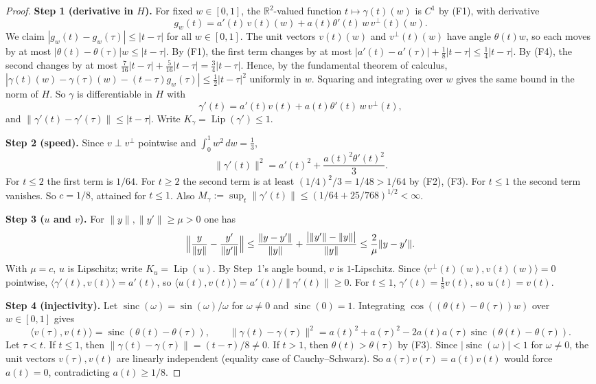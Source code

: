 \documentclass[11pt]{article}
\newcommand{\R}{\mathbb R}
\newcommand{\norm}[1]{\lVert #1\rVert}
\newcommand{\ip}[2]{\langle #1,#2\rangle}
\DeclareMathOperator{\Lip}{Lip}
\DeclareMathOperator{\sinc}{sinc}
\theoremstyle{definition}
\numberwithin{equation}{section}
\newcommand{\step}[1]{\par\smallskip\noindent\textbf{Step #1.}\enspace}
\begin{document}
\begin{proof}
\step{1 (derivative in \(H\))}
For fixed \(w\in[0,1]\), the \(\R^2\)-valued function
\(t\mapsto\gamma(t)(w)\) is \(C^1\) by (F1), with derivative
\[
 g_w(t)=a'(t)\,v(t)(w)+a(t)\theta'(t)\,w\,v^\perp(t)(w).
\]
We claim \(|g_w(t)-g_w(\tau)|\le|t-\tau|\) for all \(w\in[0,1]\).
The unit vectors \(v(t)(w)\) and \(v^\perp(t)(w)\) have angle
\(\theta(t)w\), so each moves by at most
\(|\theta(t)-\theta(\tau)|w\le|t-\tau|\). By (F1), the first term changes
by at most \(|a'(t)-a'(\tau)|+\tfrac18|t-\tau|\le\tfrac14|t-\tau|\). By
(F4), the second changes by at most
\(\tfrac7{16}|t-\tau|+\tfrac5{16}|t-\tau|=\tfrac34|t-\tau|\).
Hence, by the fundamental theorem of calculus,
\(|\gamma(t)(w)-\gamma(\tau)(w)-(t-\tau)g_w(\tau)|\le\tfrac12|t-\tau|^2\)
uniformly in \(w\). Squaring and integrating over \(w\) gives the same
bound in the norm of \(H\). So \(\gamma\) is differentiable in \(H\) with
\[
 \gamma'(t)=a'(t)v(t)+a(t)\theta'(t)\,w\,v^\perp(t),
\]
and \(\norm{\gamma'(t)-\gamma'(\tau)}\le|t-\tau|\). Write
\(K_\gamma=\Lip(\gamma')\le1\).

\step{2 (speed)}
Since \(v\perp v^\perp\) pointwise and \(\int_0^1w^2\,dw=\tfrac13\),
\[
 \norm{\gamma'(t)}^2=a'(t)^2+\frac{a(t)^2\theta'(t)^2}{3}.
\]
For \(t\le2\) the first term is \(1/64\). For \(t\ge2\) the second term is
at least \((1/4)^2/3=1/48>1/64\) by (F2), (F3). For \(t\le1\) the second
term vanishes. So \(c=1/8\), attained for \(t\le1\). Also
\(M_\gamma:=\sup_t\norm{\gamma'(t)}\le(1/64+25/768)^{1/2}<\infty\).

\step{3 (\(u\) and \(v\))}
For \(\norm y,\norm{y'}\ge\mu>0\) one has
\begin{equation}\label{aux:normalize}
 \Bigl\|\frac{y}{\norm y}-\frac{y'}{\norm{y'}}\Bigr\|
 \le\frac{\norm{y-y'}}{\norm y}
    +\frac{\bigl|\norm{y'}-\norm y\bigr|}{\norm y}
 \le\frac2\mu\norm{y-y'}.
\end{equation}
With \(\mu=c\), \(u\) is Lipschitz; write \(K_u=\Lip(u)\). By Step~1's
angle bound, \(v\) is \(1\)-Lipschitz. Since \(\ip{v^\perp(t)(w)}{v(t)(w)}=0\)
pointwise, \(\ip{\gamma'(t)}{v(t)}=a'(t)\), so
\(\ip{u(t)}{v(t)}=a'(t)/\norm{\gamma'(t)}\ge0\). For \(t\le1\),
\(\gamma'(t)=\tfrac18v(t)\), so \(u(t)=v(t)\).

\step{4 (injectivity)}
Let \(\sinc(\omega)=\sin(\omega)/\omega\) for \(\omega\ne0\) and
\(\sinc(0)=1\). Integrating \(\cos((\theta(t)-\theta(\tau))w)\) over
\(w\in[0,1]\) gives
\begin{equation}\label{aux:sinc}
 \ip{v(\tau)}{v(t)}=\sinc(\theta(t)-\theta(\tau)),\qquad
 \norm{\gamma(t)-\gamma(\tau)}^2
   =a(t)^2+a(\tau)^2-2a(t)a(\tau)\sinc(\theta(t)-\theta(\tau)).
\end{equation}
Let \(\tau<t\). If \(t\le1\), then
\(\norm{\gamma(t)-\gamma(\tau)}=(t-\tau)/8\ne0\). If \(t>1\), then
\(\theta(t)>\theta(\tau)\) by (F3). Since \(|\sinc(\omega)|<1\) for
\(\omega\ne0\), the unit vectors \(v(\tau),v(t)\) are linearly independent
(equality case of Cauchy--Schwarz). So \(a(\tau)v(\tau)=a(t)v(t)\) would
force \(a(t)=0\), contradicting \(a(t)\ge1/8\).


\end{proof}
\end{document}
